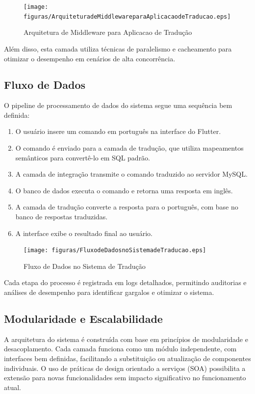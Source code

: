 \begin{figure}[H]
    \centering
    \texttt{[image: figuras/ArquiteturadeMiddlewareparaAplicacaodeTraducao.eps]}
    \caption{Arquitetura de Middleware para Aplicacao de Tradução}
    \label{fig:ArquiteturadeMiddlewareparaAplicacaodeTraducao}
\end{figure}

Além disso, esta camada utiliza técnicas de paralelismo e cacheamento para otimizar o desempenho em cenários de alta concorrência.

\subsection{Fluxo de Dados}
O pipeline de processamento de dados do sistema segue uma sequência bem definida:

\begin{enumerate}
    \item O usuário insere um comando em português na interface do Flutter.
    \item O comando é enviado para a camada de tradução, que utiliza mapeamentos semânticos para convertê-lo em SQL padrão.
    \item A camada de integração transmite o comando traduzido ao servidor MySQL.
    \item O banco de dados executa o comando e retorna uma resposta em inglês.
    \item A camada de tradução converte a resposta para o português, com base no banco de respostas traduzidas.
    \item A interface exibe o resultado final ao usuário.
\end{enumerate}

\begin{figure}[H]
    \centering
    \texttt{[image: figuras/FluxodeDadosnoSistemadeTraducao.eps]}
    \caption{Fluxo de Dados no Sistema de Tradução}
    \label{fig:FluxodeDadosnoSistemadeTraducaoo}
\end{figure}

Cada etapa do processo é registrada em logs detalhados, permitindo auditorias e análises de desempenho para identificar gargalos e otimizar o sistema.

\subsection{Modularidade e Escalabilidade}
A arquitetura do sistema é construída com base em princípios de modularidade e desacoplamento. Cada camada funciona como um módulo independente, com interfaces bem definidas, facilitando a substituição ou atualização de componentes individuais. O uso de práticas de design orientado a serviços (SOA) possibilita a extensão para novas funcionalidades sem impacto significativo no funcionamento atual.

